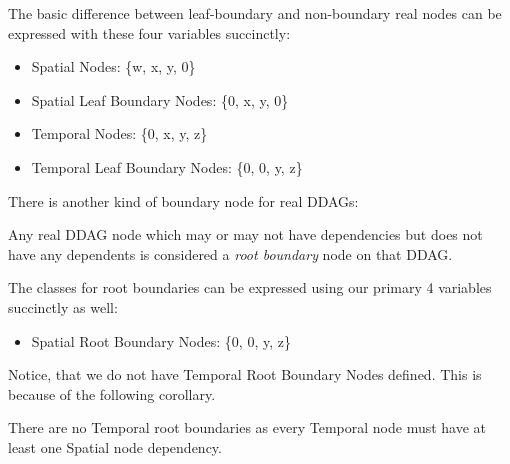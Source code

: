 The basic difference between leaf-boundary and non-boundary real nodes can be expressed with these four variables succinctly:

\begin{itemize}
	\item Spatial Nodes: \{w, x, y, 0\}
	\item Spatial Leaf Boundary Nodes: \{0, x, y, 0\}
	\item Temporal Nodes: \{0, x, y, z\}
	\item Temporal Leaf Boundary Nodes: \{0, 0, y, z\}
\end{itemize}

There is another kind of boundary node for real DDAGs:

\begin{con-def}
	\label{root-boundaries}
	Any real DDAG node which may or may not have dependencies but does not have any dependents is considered a \textit{root boundary} node on that DDAG.
\end{con-def}

The classes for root boundaries can be expressed using our primary 4 variables succinctly as well:

\begin{itemize}
	\item Spatial Root Boundary Nodes: \{0, 0, y, z\}
\end{itemize}

Notice, that we do not have Temporal Root Boundary Nodes defined. This is because of the following corollary.

\begin{con-cor}
	\label{no-temp-root-bounds}
	There are no Temporal root boundaries as every Temporal node must have at least one Spatial node dependency.
\end{con-cor}

